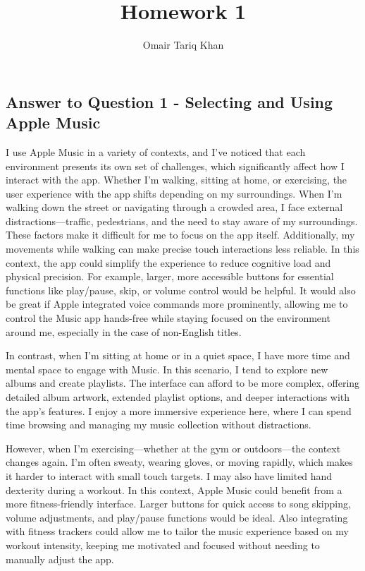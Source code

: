 \documentclass[
	letterpaper, %
]{jdf}
\author{Omair Tariq Khan}
\title{Homework 1}
\begin{document}

\maketitle
\hfill \break
\hfill \break


\subsection{Answer to Question 1 - Selecting and Using Apple Music}
I use Apple Music in a variety of contexts, and I've noticed that each environment presents its own set of challenges, which significantly affect how I interact with the app. Whether I’m walking, sitting at home, or exercising, the user experience with the app shifts depending on my surroundings. When I’m walking down the street or navigating through a crowded area, I face external distractions—traffic, pedestrians, and the need to stay aware of my surroundings. These factors make it difficult for me to focus on the app itself. Additionally, my movements while walking can make precise touch interactions less reliable. In this context, the app could simplify the experience to reduce cognitive load and physical precision. For example, larger, more accessible buttons for essential functions like play/pause, skip, or volume control would be helpful. It would also be great if Apple integrated voice commands more prominently, allowing me to control the Music app hands-free while staying focused on the environment around me, especially in the case of non-English titles. 

In contrast, when I’m sitting at home or in a quiet space, I have more time and mental space to engage with Music. In this scenario, I tend to explore new albums and create playlists. The interface can afford to be more complex, offering detailed album artwork, extended playlist options, and deeper interactions with the app’s features. I enjoy a more immersive experience here, where I can spend time browsing and managing my music collection without distractions. 

However, when I’m exercising—whether at the gym or outdoors—the context changes again. I’m often sweaty, wearing gloves, or moving rapidly, which makes it harder to interact with small touch targets. I may also have limited hand dexterity during a workout. In this context, Apple Music could benefit from a more fitness-friendly interface. Larger buttons for quick access to song skipping, volume adjustments, and play/pause functions would be ideal. Also integrating with fitness trackers could allow me to tailor the music experience based on my workout intensity, keeping me motivated and focused without needing to manually adjust the app.
\end{document}
